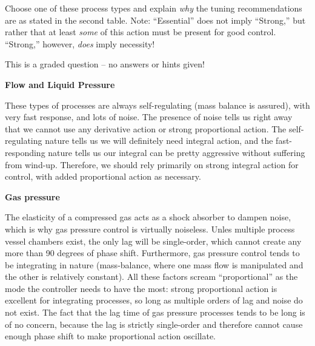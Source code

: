 Choose one of these process types and explain {\it why} the tuning recommendations are as stated in the second table.  Note: ``Essential'' does not imply ``Strong,'' but rather that at least {\it some} of this action must be present for good control.  ``Strong,'' however, {\it does} imply necessity!

\vfil

\eject






This is a graded question -- no answers or hints given!







\noindent
{\bf Flow and Liquid Pressure}

These types of processes are always self-regulating (mass balance is assured), with very fast response, and lots of noise.  The presence of noise tells us right away that we cannot use any derivative action or strong proportional action.  The self-regulating nature tells us we will definitely need integral action, and the fast-responding nature tells us our integral can be pretty aggressive without suffering from wind-up.  Therefore, we should rely primarily on strong integral action for control, with added proportional action as necessary.

\vskip 20pt

\noindent
{\bf Gas pressure}

The elasticity of a compressed gas acts as a shock absorber to dampen noise, which is why gas pressure control is virtually noiseless.  Unles multiple process vessel chambers exist, the only lag will be single-order, which cannot create any more than 90 degrees of phase shift.  Furthermore, gas pressure control tends to be integrating in nature (mass-balance, where one mass flow is manipulated and the other is relatively constant).  All these factors scream ``proportional'' as the mode the controller needs to have the most: strong proportional action is excellent for integrating processes, so long as multiple orders of lag and noise do not exist.  The fact that the lag time of gas pressure processes tends to be long is of no concern, because the lag is strictly single-order and therefore cannot cause enough phase shift to make proportional action oscillate.

